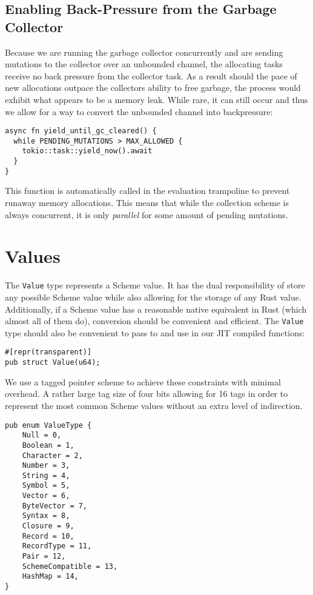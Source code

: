 \documentclass[sigplan,authordraft]{acmart}
\begin{document}
\subsection{Enabling Back-Pressure from the Garbage Collector}

Because we are running the garbage collector concurrently and are sending
mutations to the collector over an unbounded channel, the allocating tasks
receive no back pressure from the collector task. As a result should the pace
of new allocations outpace the collectors ability to free garbage, the process
would exhibit what appears to be a memory leak. While rare, it can still occur
and thus we allow for a way to convert the unbounded channel into backpressure:

\begin{verbatim}
async fn yield_until_gc_cleared() {
  while PENDING_MUTATIONS > MAX_ALLOWED {
    tokio::task::yield_now().await
  }
}
\end{verbatim}

This function is automatically called in the evaluation trampoline to prevent
runaway memory allocations. This means that while the collection scheme is
always concurrent, it is only \textit{parallel} for some amount of pending
mutations.

\section{Values}

The \texttt{Value} type represents a Scheme value. It has the dual responsibility
of store any possible Scheme value while also allowing for the storage of any
Rust value. Additionally, if a Scheme value has a reasonable native equivalent
in Rust (which almost all of them do), conversion should be convenient and
efficient. The \texttt{Value} type should also be convenient to pass to and use in our
JIT compiled functions:

\begin{verbatim}
#[repr(transparent)]
pub struct Value(u64);
\end{verbatim}

We use a tagged pointer\cite{tags} scheme to achieve these constraints with
minimal overhead. A rather large tag size of four bits allowing for 16 tags in
order to represent the most common Scheme values without an extra level of
indirection.

\begin{verbatim}
pub enum ValueType {
    Null = 0,
    Boolean = 1,
    Character = 2,
    Number = 3,
    String = 4,
    Symbol = 5,
    Vector = 6,
    ByteVector = 7,
    Syntax = 8,
    Closure = 9,
    Record = 10,
    RecordType = 11,
    Pair = 12,
    SchemeCompatible = 13,
    HashMap = 14,
}
\end{verbatim}
\end{document}
